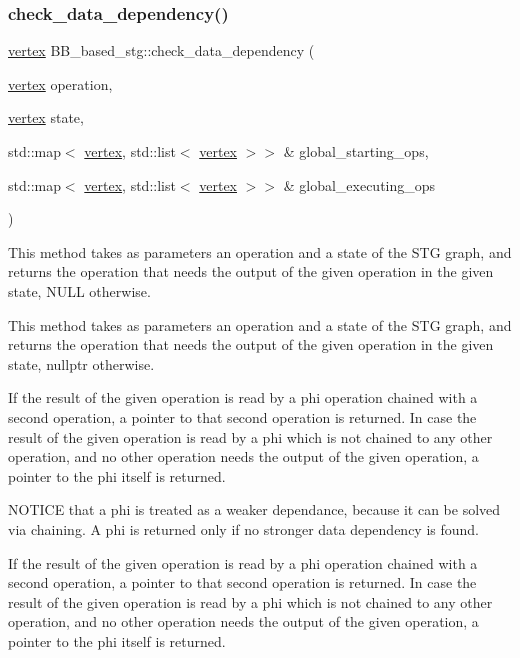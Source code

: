 \subsubsection{\texorpdfstring{check\+\_\+data\+\_\+dependency()}{check\_data\_dependency()}}
{\footnotesize\ttfamily \hyperlink{graph_8hpp_abefdcf0544e601805af44eca032cca14}{vertex} B\+B\+\_\+based\+\_\+stg\+::check\+\_\+data\+\_\+dependency (\begin{DoxyParamCaption}\item[{\hyperlink{graph_8hpp_abefdcf0544e601805af44eca032cca14}{vertex}}]{operation,  }\item[{\hyperlink{graph_8hpp_abefdcf0544e601805af44eca032cca14}{vertex}}]{state,  }\item[{std\+::map$<$ \hyperlink{graph_8hpp_abefdcf0544e601805af44eca032cca14}{vertex}, std\+::list$<$ \hyperlink{graph_8hpp_abefdcf0544e601805af44eca032cca14}{vertex} $>$$>$ \&}]{global\+\_\+starting\+\_\+ops,  }\item[{std\+::map$<$ \hyperlink{graph_8hpp_abefdcf0544e601805af44eca032cca14}{vertex}, std\+::list$<$ \hyperlink{graph_8hpp_abefdcf0544e601805af44eca032cca14}{vertex} $>$$>$ \&}]{global\+\_\+executing\+\_\+ops }\end{DoxyParamCaption})\hspace{0.3cm}{\ttfamily [private]}}



This method takes as parameters an operation and a state of the S\+TG graph, and returns the operation that needs the output of the given operation in the given state, N\+U\+LL otherwise. 

This method takes as parameters an operation and a state of the S\+TG graph, and returns the operation that needs the output of the given operation in the given state, nullptr otherwise.

If the result of the given operation is read by a phi operation chained with a second operation, a pointer to that second operation is returned. In case the result of the given operation is read by a phi which is not chained to any other operation, and no other operation needs the output of the given operation, a pointer to the phi itself is returned.

N\+O\+T\+I\+CE that a phi is treated as a weaker dependance, because it can be solved via chaining. A phi is returned only if no stronger data dependency is found.

If the result of the given operation is read by a phi operation chained with a second operation, a pointer to that second operation is returned. In case the result of the given operation is read by a phi which is not chained to any other operation, and no other operation needs the output of the given operation, a pointer to the phi itself is returned.

